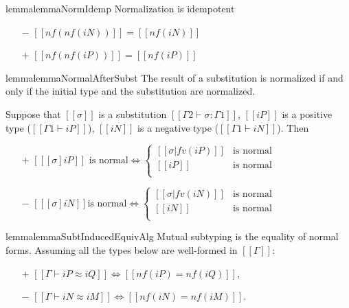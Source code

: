 \begin{restatable}{lemma}{lemmaNormIdemp}
    \label{lemma:norm-idemp}
    Normalization is idempotent
    \begin{itemize}
    \item[$-$] $[[nf(nf(iN))]] = [[nf(iN)]]$
    \item[$+$] $[[nf(nf(iP))]] = [[nf(iP)]]$
    \end{itemize}
\end{restatable}

\begin{restatable}{lemma}{lemmaNormalAfterSubst}
    \label{lemma:normal-after-subst}
    The result of a substitution is normalized if and only if the initial type and
    the substitution are normalized.

    Suppose that $[[σ]]$ is a substitution  $[[Γ2 ⊢ σ : Γ1]]$,
    $[[iP]]$ is a positive type ($[[Γ1 ⊢ iP]]$),
    $[[iN]]$ is a negative type ($[[Γ1 ⊢ iN]]$). Then
    \begin{itemize}
    \item[$+$]
        $[[ [σ]iP  ]] \text{ is normal} \iff
        \begin{cases}
            [[σ|fv(iP)]] &\text{is normal}\\
            [[iP]]       &\text{is normal}\\
        \end{cases} $
    \item[$-$]
        $[[ [σ]iN  ]] \text{is normal} \iff
        \begin{cases}
            [[σ|fv(iN)]] &\text{is normal}\\
            [[iN]]       &\text{is normal}\\
        \end{cases} $
    \end{itemize}
\end{restatable}


\begin{restatable}{lemma}{lemmaSubtInducedEquivAlg}
    \label{lemma:subt-equiv-algorithmization}
    Mutual subtyping is the equality of normal forms.
 Assuming all the types below are well-formed in $[[Γ]]$:
    \begin{itemize}
        \item [$+$] $[[Γ ⊢ iP ≈ iQ]] \iff [[nf(iP) = nf(iQ)]]$,
        \item [$-$] $[[Γ ⊢ iN ≈ iM]] \iff [[nf(iN) = nf(iM)]]$.
    \end{itemize}
\end{restatable}


